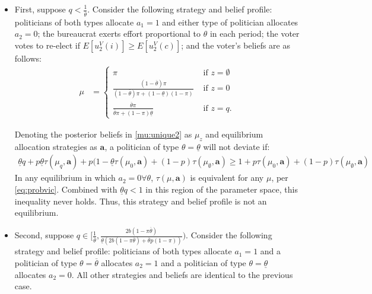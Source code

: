 \documentclass[11pt,english]{article}
\begin{document}
\begin{itemize}
\item First, suppose $q < \frac{1}{\overline{\theta}}$. Consider the following strategy and belief profile: politicians of both types allocate $a_1 = 1$ and either type of politician allocates $a_2 = 0$; the bureaucrat exerts effort proportional to $\theta$ in each period; the voter votes to re-elect if $E[u_2^V(i)] \geq E[u_2^V(c)]$; and the voter's beliefs are as follows:
\begin{align}\label{mu:unique2}
\mu &= \begin{cases}
\pi & \text{ if } z =\emptyset\\
\frac{(1-\overline{\theta})\pi}{(1-\overline{\theta})\pi + (1-\underline{\theta})(1-\pi)} & \text{ if } z = 0\\
\frac{\overline{\theta}\pi}{\overline{\theta}\pi + (1-\pi)\underline{\theta}} & \text{ if } z = q .
\end{cases}
\end{align}

Denoting the posterior beliefs in \eqref{mu:unique2} as $\mu_z$ and equilibrium allocation strategies as $\boldsymbol{a}$, a politician of type $\theta = \underline{\theta}$ will not deviate if:
\begin{align*}
\underline{\theta}q + p \underline{\theta}\tau(\mu_q, \boldsymbol{a})+ p(1-\underline{\theta}\tau(\mu_0, \boldsymbol{a}) + (1-p)\tau(\mu_\emptyset, \boldsymbol{a}) \geq 1 + p\tau(\mu_0, \boldsymbol{a})+(1-p)\tau(\mu_\emptyset, \boldsymbol{a})
\end{align*}
In any equilibrium in which $a_2 = 0 \forall \theta$, $\tau(\mu, \boldsymbol{a})$ is equivalent for any $\mu$, per \eqref{eq:probvic}. Combined with $\underline{\theta}q < 1$ in this region of the parameter space, this inequality never holds. Thus, this strategy and belief profile is not an equilibrium.
\item Second, suppose $q \in[\frac{1}{\overline{\theta}},\frac{2b (1 - \pi \overline{\theta})}{\underline{\theta}(2b(1-\pi \overline{\theta})+\overline{\theta}p(1-\pi))})$. Consider the following strategy and belief profile: politicians of both types allocate $a_1 = 1$ and a politician of type $\theta = \overline{\theta}$ allocates $a_2 = 1$ and a politician of type $\theta = \underline{\theta}$ allocates $a_2=0$. All other strategies and beliefs are identical to the previous case.


\end{itemize}
\end{document}
